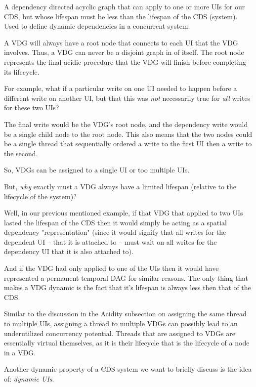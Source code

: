 \begin{con-def}
	\label{vdg}
	A dependency directed acyclic graph that can apply to one or more UIs for our CDS, but whose lifespan must be less than the lifespan of the CDS (system). Used to define dynamic dependencies in a concurrent system.
\end{con-def}

A VDG will always have a root node that connects to each UI that the VDG involves. Thus, a VDG can never be a disjoint graph in of itself. The root node represents the final acidic procedure that the VDG will finish before completing its lifecycle.

For example, what if a particular write on one UI needed to happen before a different write on another UI, but that this was \textit{not} necessarily true for \textit{all} writes for these two UIs?

The final write would be the VDG's root node, and the dependency write would be a single child node to the root node. This also means that the two nodes could be a single thread that sequentially ordered a write to the first UI then a write to the second.

So, VDGs can be assigned to a single UI or too multiple UIs.

But, \textit{why} exactly must a VDG always have a limited lifespan (relative to the lifecycle of the system)?

Well, in our previous mentioned example, if that VDG that applied to two UIs lasted the lifespan of the CDS then it would simply be acting as a spatial dependency "representation" (since it would signify that all writes for the dependent UI -- that it is attached to -- must wait on all writes for the dependency UI that it is also attached to). 

And if the VDG had only applied to one of the UIs then it would have represented a permanent temporal DAG for similar reasons. The only thing that makes a VDG dynamic is the fact that it's lifespan is always less then that of the CDS.

Similar to the discussion in the Acidity subsection on assigning the same thread to multiple UIs, assigning a thread to multiple VDGs can possibly lead to an underutilized concurrency potential. Threads that are assigned to VDGs are essentially virtual themselves, as it is their lifecycle that is the lifecycle of a node in a VDG.

Another dynamic property of a CDS system we want to briefly discuss is the idea of: \textit{dynamic UIs}.

